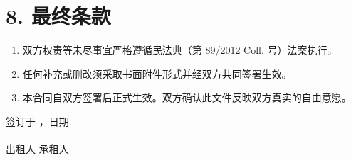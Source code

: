 \section*{8. 最终条款}
\begin{enumerate}[label=\arabic*.]
\item 双方权责等未尽事宜严格遵循民法典（第 89/2012 Coll. 号）法案执行。
\item 任何补充或删改须采取书面附件形式并经双方共同签署生效。
\item 本合同自双方签署后正式生效。双方确认此文件反映双方真实的自由意愿。
\end{enumerate}
\vspace{2cm}
签订于 \ContractPlace，日期 \ContractDate \hfill \underline{\hspace{5cm}} \\ \vspace{1.5cm}
\underline{\hspace{5cm}} \hfill \underline{\hspace{5cm}} \\ \vspace{0.2cm}出租人 \hfill 承租人 \\
